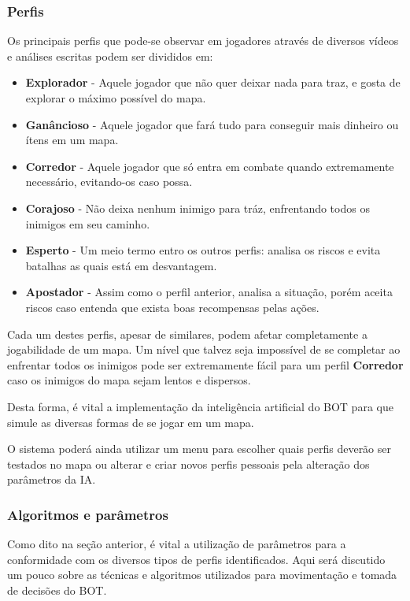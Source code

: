 \subsubsection{Perfis}

Os principais perfis que pode-se observar em jogadores através de diversos vídeos \cite{letsplay1} \cite{letsplay2} \cite{letsplay3} e análises escritas podem ser divididos em:

\begin{itemize}
	\item \textbf{Explorador} - Aquele jogador que não quer deixar nada para traz, e gosta de explorar o máximo possível do mapa.
	\item \textbf{Ganâncioso} - Aquele jogador que fará tudo para conseguir mais dinheiro ou ítens em um mapa. 
	\item \textbf{Corredor} - Aquele jogador que só entra em combate quando extremamente necessário, evitando-os caso possa.
	\item \textbf{Corajoso} - Não deixa nenhum inimigo para tráz, enfrentando todos os inimigos em seu caminho.
	\item \textbf{Esperto} - Um meio termo entro os outros perfis: analisa os riscos e evita batalhas as quais está em desvantagem.
	\item \textbf{Apostador} - Assim como o perfil anterior, analisa a situação, porém aceita riscos caso entenda que exista boas recompensas pelas ações.
\end{itemize}

Cada um destes perfis, apesar de similares, podem afetar completamente a jogabilidade de um mapa. Um nível que talvez seja impossível de se completar ao enfrentar todos os inimigos pode ser extremamente fácil para um perfil \textbf{Corredor} caso os inimigos do mapa sejam lentos e dispersos.

Desta forma, é vital a implementação da inteligência artificial do BOT para que simule as diversas formas de se jogar em um mapa. 

O sistema poderá ainda utilizar um menu para escolher quais perfis deverão ser testados no mapa ou alterar e criar novos perfis pessoais pela alteração dos parâmetros da IA. 

\subsubsection{Algoritmos e parâmetros}

Como dito na seção anterior, é vital a utilização de parâmetros para a conformidade com os diversos tipos de perfis identificados. Aqui será discutido um pouco sobre as técnicas e algoritmos utilizados para movimentação e tomada de decisões do BOT.

